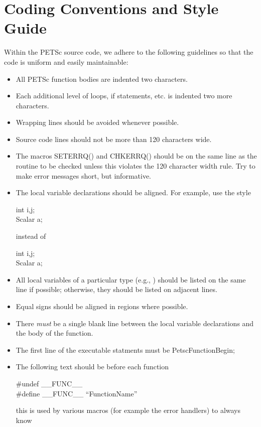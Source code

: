 \documentclass[twoside,12pt]{../sty/report_petsc}
\begin{document}
\section{Coding Conventions and Style Guide}

Within the PETSc source code, we adhere to the following guidelines
so that the code is uniform and easily maintainable:

\begin{itemize}
\item All PETSc function bodies are indented two characters.
\item Each additional level of loops, if statements, etc. is indented
      two more characters.
\item Wrapping lines should be avoided whenever possible.
\item Source code lines should not be more than 120 characters wide.
\item The macros SETERRQ() and CHKERRQ() should be on the 
      same line as the routine to be checked unless this violates the 
      120 character width rule. Try to make error messages short, but 
      informative.
\item The local variable declarations should be aligned. For example,
      use the style
\begin{tabbing}
   int    i,j;\\
   Scalar a;
\end{tabbing}
instead of
\begin{tabbing}
   int i,j;\\
   Scalar a;
\end{tabbing}
\item All local variables of a particular type (e.g., ) should be 
      listed on the same line if possible; otherwise, they should be listed
      on adjacent lines.
\item Equal signs should be aligned in regions where possible.
\item There {\em must} be a single blank line
      between the local variable declarations and the body of the function.
\item The first line of the executable statments must be PetscFunctionBegin;
\item The following text should be before each function
\begin{tabbing}
\#undef \_\_FUNC\_\_\\
\#define \_\_FUNC\_\_ ``FunctionName''
\end{tabbing}
this is used by various macros (for example the error handlers) to always know

\end{itemize}
\end{document}
